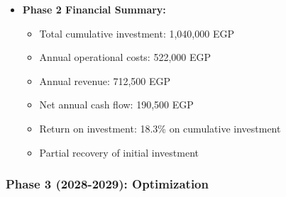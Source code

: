 \begin{itemize}
    \item \textbf{Phase 2 Financial Summary:}
    \begin{itemize}
        \item Total cumulative investment: 1,040,000 EGP
        \item Annual operational costs: 522,000 EGP
        \item Annual revenue: 712,500 EGP
        \item Net annual cash flow: 190,500 EGP
        \item Return on investment: 18.3\% on cumulative investment
        \item Partial recovery of initial investment
    \end{itemize}
\end{itemize}

\subsubsection{Phase 3 (2028-2029): Optimization}
